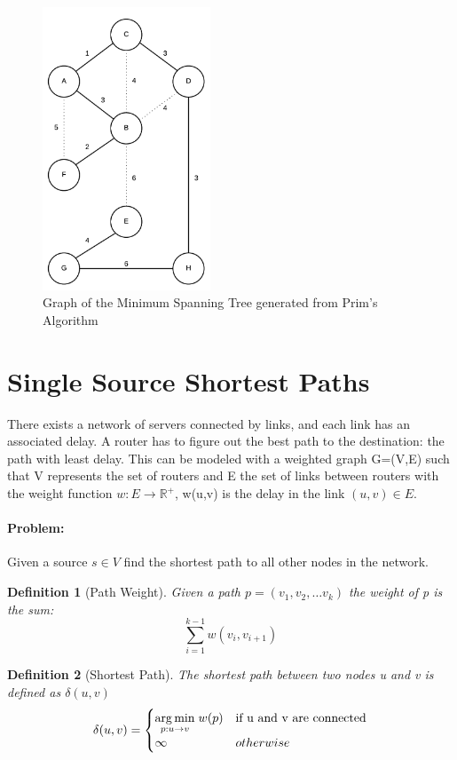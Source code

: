 \documentclass[12pt,letterpaper]{article}
\newtheorem{definition}{Definition}[section]
\begin{document}
\begin{figure}[h]
\centering
\includegraphics[width=5cm]{mst2}
\caption{Graph of the Minimum Spanning Tree generated from Prim's Algorithm}
\end{figure}
\FloatBarrier
\section{Single Source Shortest Paths}
There exists a network of servers connected by links, and each link has an associated delay. A router has to figure out the best path to the destination: the path with least delay. This can be modeled with a weighted graph G=(V,E) such that V represents the set of routers and E the set of links between routers with the weight function $w : E\to \mathbb{R}^+$, w(u,v) is the delay in the link $(u,v)\in E$.
\paragraph{Problem:} Given a source $s\in V$ find the shortest path to all other nodes in the network. 
\begin{definition}[Path Weight]\hfill \break
Given a path $p=(v_1, v_2,\dots v_k)$ the weight of p is the sum: 
\[\sum_{i=1}^{k-1}{w(v_i,v_{i+1})}\]
\end{definition}
\begin{definition}[Shortest Path]\hfill \break
The shortest path between two nodes u and v is defined as $\delta (u,v)$ 
\[\delta (u,v)=\begin{cases}\underset{p:u \to v}{\arg\min} \hspace{1mm} w(p) & \text{if u and v are connected}\\ \infty & otherwise\end{cases}\]
\end{definition}
\end{document}
